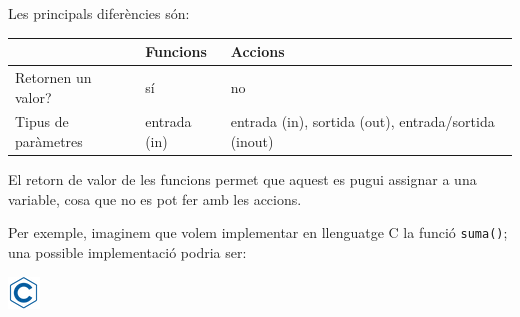 \documentclass[]{book}
\begin{document}
Les principals diferències són:

\begin{longtable}[]{@{}lll@{}}
\toprule
\begin{minipage}[b]{0.24\columnwidth}\raggedright\strut
\strut
\end{minipage} & \begin{minipage}[b]{0.11\columnwidth}\raggedright\strut
Funcions\strut
\end{minipage} & \begin{minipage}[b]{0.10\columnwidth}\raggedright\strut
Accions\strut
\end{minipage}\tabularnewline
\midrule
\endhead
\begin{minipage}[t]{0.24\columnwidth}\raggedright\strut
Retornen un valor?\strut
\end{minipage} & \begin{minipage}[t]{0.11\columnwidth}\raggedright\strut
sí\strut
\end{minipage} & \begin{minipage}[t]{0.10\columnwidth}\raggedright\strut
no\strut
\end{minipage}\tabularnewline
\begin{minipage}[t]{0.24\columnwidth}\raggedright\strut
Tipus de paràmetres\strut
\end{minipage} & \begin{minipage}[t]{0.11\columnwidth}\raggedright\strut
entrada (in)\strut
\end{minipage} & \begin{minipage}[t]{0.10\columnwidth}\raggedright\strut
entrada (in), sortida (out), entrada/sortida (inout)\strut
\end{minipage}\tabularnewline
\bottomrule
\end{longtable}

El retorn de valor de les funcions permet que aquest es pugui assignar a
una variable, cosa que no es pot fer amb les accions.

Per exemple, imaginem que volem implementar en llenguatge C la funció
\texttt{suma()}; una possible implementació podria ser:

\includegraphics{./img/c.png}
\end{document}
